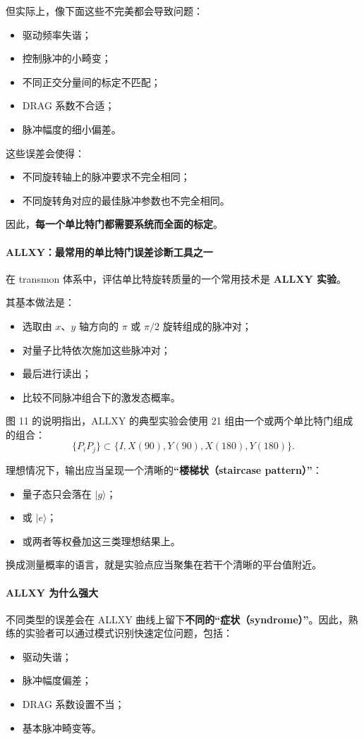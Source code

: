 \documentclass[12pt,a4paper,oneside]{ctexbook}
\begin{document}
但实际上，像下面这些不完美都会导致问题：
\begin{itemize}
    \item 驱动频率失谐；
    \item 控制脉冲的小畸变；
    \item 不同正交分量间的标定不匹配；
    \item DRAG 系数不合适；
    \item 脉冲幅度的细小偏差。
\end{itemize}

这些误差会使得：
\begin{itemize}
    \item 不同旋转轴上的脉冲要求不完全相同；
    \item 不同旋转角对应的最佳脉冲参数也不完全相同。
\end{itemize}

因此，\textbf{每一个单比特门都需要系统而全面的标定}。

\paragraph{ALLXY：最常用的单比特门误差诊断工具之一}
在 transmon 体系中，评估单比特旋转质量的一个常用技术是 \textbf{ALLXY 实验}。

其基本做法是：
\begin{itemize}
    \item 选取由 \(x\)、\(y\) 轴方向的 \(\pi\) 或 \(\pi/2\) 旋转组成的脉冲对；
    \item 对量子比特依次施加这些脉冲对；
    \item 最后进行读出；
    \item 比较不同脉冲组合下的激发态概率。
\end{itemize}

图 11 的说明指出，ALLXY 的典型实验会使用 21 组由一个或两个单比特门组成的组合：
\[
\{P_iP_j\}\subset \{I, X(90), Y(90), X(180), Y(180)\}.
\]

理想情况下，输出应当呈现一个清晰的\textbf{“楼梯状（staircase pattern）”}：
\begin{itemize}
    \item 量子态只会落在 \(|g\rangle\)；
    \item 或 \(|e\rangle\)；
    \item 或两者等权叠加这三类理想结果上。
\end{itemize}

换成测量概率的语言，就是实验点应当聚集在若干个清晰的平台值附近。

\paragraph{ALLXY 为什么强大}
不同类型的误差会在 ALLXY 曲线上留下\textbf{不同的“症状（syndrome）”}。因此，熟练的实验者可以通过模式识别快速定位问题，包括：
\begin{itemize}
    \item 驱动失谐；
    \item 脉冲幅度偏差；
    \item DRAG 系数设置不当；
    \item 基本脉冲畸变等。
\end{itemize}
\end{document}
